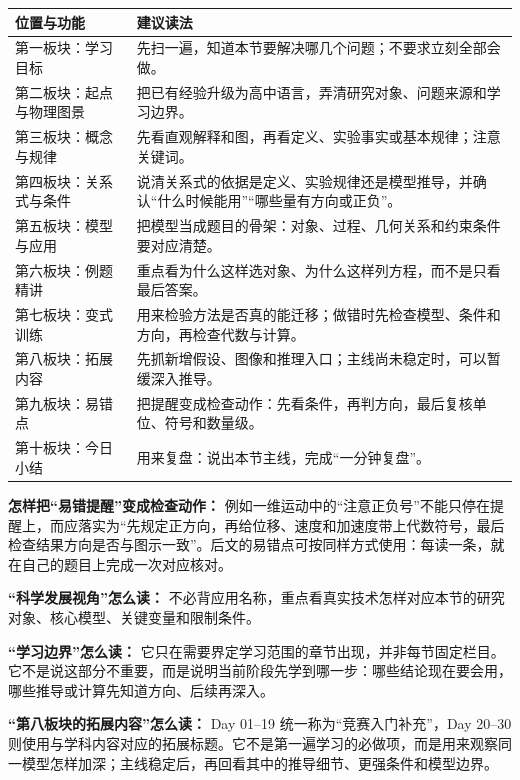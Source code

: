 \begin{center}
\begin{tabular}{p{}p{}}
\toprule
\textbf{位置与功能} & \textbf{建议读法} \\
\midrule
第一板块：学习目标 & 先扫一遍，知道本节要解决哪几个问题；不要求立刻全部会做。 \\
第二板块：起点与物理图景 & 把已有经验升级为高中语言，弄清研究对象、问题来源和学习边界。 \\
第三板块：概念与规律 & 先看直观解释和图，再看定义、实验事实或基本规律；注意关键词。 \\
第四板块：关系式与条件 & 说清关系式的依据是定义、实验规律还是模型推导，并确认“什么时候能用”“哪些量有方向或正负”。 \\
第五板块：模型与应用 & 把模型当成题目的骨架：对象、过程、几何关系和约束条件要对应清楚。 \\
第六板块：例题精讲 & 重点看为什么这样选对象、为什么这样列方程，而不是只看最后答案。 \\
第七板块：变式训练 & 用来检验方法是否真的能迁移；做错时先检查模型、条件和方向，再检查代数与计算。 \\
第八板块：拓展内容 & 先抓新增假设、图像和推理入口；主线尚未稳定时，可以暂缓深入推导。 \\
第九板块：易错点 & 把提醒变成检查动作：先看条件，再判方向，最后复核单位、符号和数量级。 \\
第十板块：今日小结 & 用来复盘：说出本节主线，完成“一分钟复盘”。 \\
\bottomrule
\end{tabular}
\end{center}

\textbf{怎样把“易错提醒”变成检查动作：} 例如一维运动中的“注意正负号”不能只停在提醒上，而应落实为“先规定正方向，再给位移、速度和加速度带上代数符号，最后检查结果方向是否与图示一致”。后文的易错点可按同样方式使用：每读一条，就在自己的题目上完成一次对应核对。

\textbf{“科学发展视角”怎么读：} 不必背应用名称，重点看真实技术怎样对应本节的研究对象、核心模型、关键变量和限制条件。

\textbf{“学习边界”怎么读：} 它只在需要界定学习范围的章节出现，并非每节固定栏目。它不是说这部分不重要，而是说明当前阶段先学到哪一步：哪些结论现在要会用，哪些推导或计算先知道方向、后续再深入。

\textbf{“第八板块的拓展内容”怎么读：} Day 01--19 统一称为“竞赛入门补充”，Day 20--30 则使用与学科内容对应的拓展标题。它不是第一遍学习的必做项，而是用来观察同一模型怎样加深；主线稳定后，再回看其中的推导细节、更强条件和模型边界。


